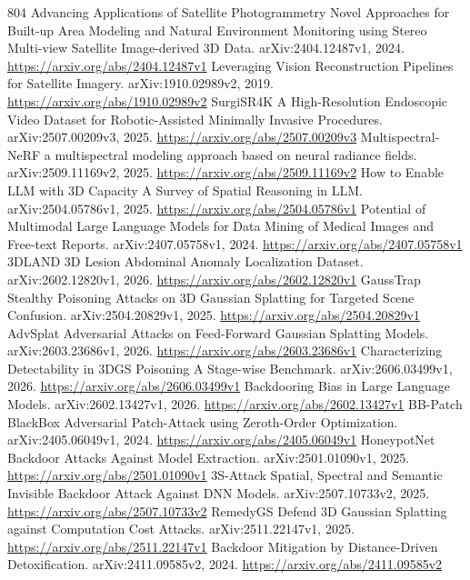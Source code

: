 \documentclass[11pt]{article}
\begin{document}
\begin{thebibliography}{804}
 Advancing Applications of Satellite Photogrammetry Novel Approaches for Built-up Area Modeling and Natural Environment Monitoring using Stereo Multi-view Satellite Image-derived 3D Data. arXiv:2404.12487v1, 2024. \url{https://arxiv.org/abs/2404.12487v1}
 Leveraging Vision Reconstruction Pipelines for Satellite Imagery. arXiv:1910.02989v2, 2019. \url{https://arxiv.org/abs/1910.02989v2}
 SurgiSR4K A High-Resolution Endoscopic Video Dataset for Robotic-Assisted Minimally Invasive Procedures. arXiv:2507.00209v3, 2025. \url{https://arxiv.org/abs/2507.00209v3}
 Multispectral-NeRF a multispectral modeling approach based on neural radiance fields. arXiv:2509.11169v2, 2025. \url{https://arxiv.org/abs/2509.11169v2}
 How to Enable LLM with 3D Capacity A Survey of Spatial Reasoning in LLM. arXiv:2504.05786v1, 2025. \url{https://arxiv.org/abs/2504.05786v1}
 Potential of Multimodal Large Language Models for Data Mining of Medical Images and Free-text Reports. arXiv:2407.05758v1, 2024. \url{https://arxiv.org/abs/2407.05758v1}
 3DLAND 3D Lesion Abdominal Anomaly Localization Dataset. arXiv:2602.12820v1, 2026. \url{https://arxiv.org/abs/2602.12820v1}
 GaussTrap Stealthy Poisoning Attacks on 3D Gaussian Splatting for Targeted Scene Confusion. arXiv:2504.20829v1, 2025. \url{https://arxiv.org/abs/2504.20829v1}
 AdvSplat Adversarial Attacks on Feed-Forward Gaussian Splatting Models. arXiv:2603.23686v1, 2026. \url{https://arxiv.org/abs/2603.23686v1}
 Characterizing Detectability in 3DGS Poisoning A Stage-wise Benchmark. arXiv:2606.03499v1, 2026. \url{https://arxiv.org/abs/2606.03499v1}
 Backdooring Bias in Large Language Models. arXiv:2602.13427v1, 2026. \url{https://arxiv.org/abs/2602.13427v1}
 BB-Patch BlackBox Adversarial Patch-Attack using Zeroth-Order Optimization. arXiv:2405.06049v1, 2024. \url{https://arxiv.org/abs/2405.06049v1}
 HoneypotNet Backdoor Attacks Against Model Extraction. arXiv:2501.01090v1, 2025. \url{https://arxiv.org/abs/2501.01090v1}
 3S-Attack Spatial, Spectral and Semantic Invisible Backdoor Attack Against DNN Models. arXiv:2507.10733v2, 2025. \url{https://arxiv.org/abs/2507.10733v2}
 RemedyGS Defend 3D Gaussian Splatting against Computation Cost Attacks. arXiv:2511.22147v1, 2025. \url{https://arxiv.org/abs/2511.22147v1}
 Backdoor Mitigation by Distance-Driven Detoxification. arXiv:2411.09585v2, 2024. \url{https://arxiv.org/abs/2411.09585v2}

\end{thebibliography}
\end{document}
